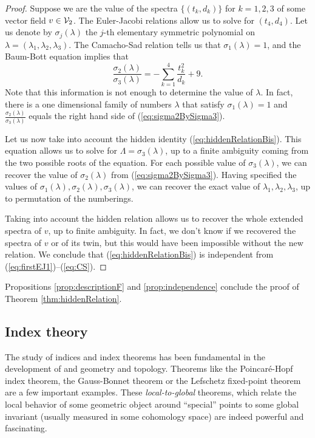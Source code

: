\documentclass[phd,tocprelim]{cornell}
\begin{document}
\begin{proof}
 Suppose we are the value of the spectra $\{(t_k,d_k)\}$ for $k=1,2,3$ of some vector field $v\in\mathcal{V}_2$. The Euler-Jacobi relations allow us to solve for $(t_4,d_4)$. Let us denote by $\sigma_j(\lambda)$ the $j$-th elementary symmetric polynomial on $\lambda=(\lambda_1,\lambda_2,\lambda_3)$. The Camacho-Sad relation tells us that $\sigma_1(\lambda)=1$, and the Baum-Bott equation implies that
  \begin{equation}\label{eq:sigma2BySigma3}
   \frac{\sigma_2(\lambda)}{\sigma_3(\lambda)} = -\sum_{k=1}^4 \frac{t_k^2}{d_k} + 9 .
  \end{equation}
 Note that this information is not enough to determine the value of $\lambda$. In fact, there is a one dimensional family of numbers $\lambda$ that satisfy $\sigma_1(\lambda)=1$ and $\frac{\sigma_2(\lambda)}{\sigma_3(\lambda)}$ equals the right hand side of (\ref{eq:sigma2BySigma3}).
 
 Let us now take into account the hidden identity (\ref{eq:hiddenRelationBis}). This equation allows us to solve for $\Lambda=\sigma_3(\lambda)$, up to a finite ambiguity coming from the two possible roots of the equation. For each possible value of $\sigma_3(\lambda)$, we can recover the value of $\sigma_2(\lambda)$ from (\ref{eq:sigma2BySigma3}). Having specified the values of $\sigma_1(\lambda),\sigma_2(\lambda),\sigma_3(\lambda)$, we can recover the exact value of $\lambda_1,\lambda_2,\lambda_3$, up to permutation of the numberings. 
 
 Taking into account the hidden relation allows us to recover the whole extended spectra of $v$, up to finite ambiguity. In fact, we don't know if we recovered the spectra of $v$ or of its twin, but this would have been impossible without the new relation. We conclude that (\ref{eq:hiddenRelationBis}) is independent from (\ref{eq:firstEJ1})--(\ref{eq:CS}).
\end{proof}

Propositions \ref{prop:descriptionF} and \ref{prop:independence} conclude the proof of Theorem \ref{thm:hiddenRelation}.


\subsection{Index theory}

The study of indices and index theorems has been fundamental in the development of and geometry and topology. Theorems like the Poincar\'{e}-Hopf index theorem, the Gauss-Bonnet theorem or the Lefschetz fixed-point theorem are a few important examples. These \textit{local-to-global} theorems, which relate the local behavior of some geometric object around ``special'' points to some global invariant (usually measured in some cohomology space) are indeed powerful and fascinating.
\end{document}
